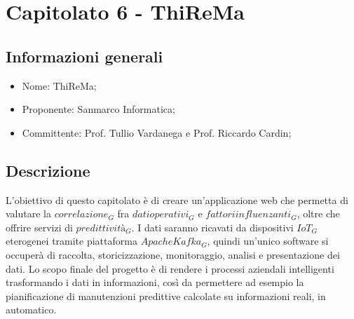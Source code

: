 \section{Capitolato 6 - ThiReMa}
\subsection{Informazioni generali}
\begin{itemize}
	\item Nome: ThiReMa;
	\item Proponente: Sanmarco Informatica;
	\item Committente: Prof. Tullio Vardanega e Prof. Riccardo Cardin;
\end{itemize}
\subsection{Descrizione}
L'obiettivo di questo capitolato è di creare un'applicazione web che permetta di valutare la $correlazione_G$ fra $dati operativi_G$ e $fattori influenzanti_G$, oltre che offrire servizi di $predittività_G$. I dati saranno ricavati da dispositivi $IoT_G$ eterogenei tramite piattaforma $Apache Kafka_G$, quindi un'unico software si occuperà di raccolta, storicizzazione, monitoraggio, analisi e presentazione dei dati.
Lo scopo finale del progetto è di rendere i processi aziendali intelligenti trasformando i dati in informazioni, così da permettere ad esempio la pianificazione di manutenzioni predittive calcolate su informazioni reali, in automatico.


